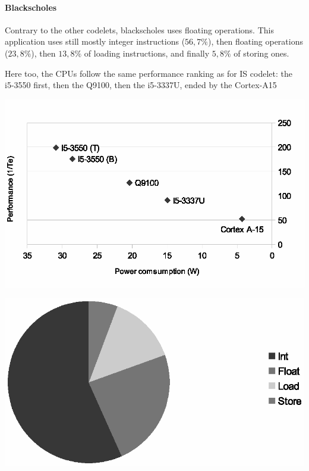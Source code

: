 \documentclass{article}
\newenvironment{Figure}
  {\par\medskip\noindent\center\minipage{0.9\linewidth}}
  {\endminipage\par\bigskip\medskip}
\begin{document}
\begin{multicols}{2}
\paragraph{Blackscholes\\}
\label{Blackscholes}
Contrary to the other codelets, blackscholes uses floating operations. This application uses still mostly integer instructions ($56,7\%$), then floating operations ($23,8\%$), then $13,8\%$ of loading instructions, and finally $5,8\%$ of storing ones.


Here too, the CPUs follow the same performance ranking as for IS codelet: the i5-3550 first, then the Q9100, then the i5-3337U, ended by the Cortex-A15


\begin{Figure}
\centering
\includegraphics[width=\linewidth]{Blackscholes.eps}
\end{Figure}

\begin{Figure}
\centering
\includegraphics[width=\linewidth]{Blackscholes_instr.eps}
\end{Figure}


\end{multicols}
\end{document}
